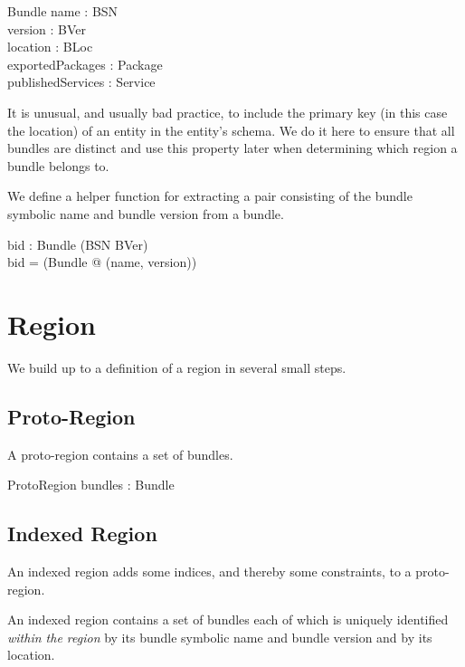 \documentclass[a4paper,9pt]{article}
\begin{document}
\begin{schema}{Bundle}
  name : BSN \\
  version : BVer \\
  location : BLoc \\
  exportedPackages : \power Package \\
  publishedServices : \power Service \\
\end{schema}
It is unusual, and usually bad practice, to include the primary key (in this case the location) of
an entity in the entity's schema.
We do it here to ensure that all bundles are
distinct and use this property later when determining which region a bundle belongs to.

We define a helper function for extracting a pair consisting of the bundle symbolic name and bundle
version from a bundle. 
\begin{axdef}
  bid : Bundle \fun (BSN \cross BVer) \\
\where
  bid =  (\lambda Bundle @ (name, version)) \\
\end{axdef}

\clearpage
\section{Region}
\label{cha:region}

We build up to a definition of a region in several small steps.

\subsection{Proto-Region}

A proto-region contains a set of bundles.
\begin{schema}{ProtoRegion}
  bundles : \power Bundle \\
\end{schema}

\subsection{Indexed Region}

An indexed region adds some indices, and thereby some constraints, to a proto-region.

An indexed region contains a set of bundles each of which is uniquely identified \textit{within the region}
by its bundle symbolic name and bundle version and by its location.
\end{document}
